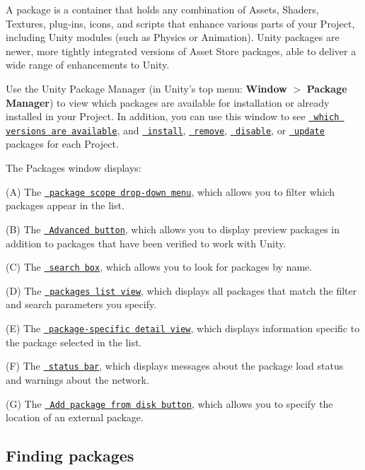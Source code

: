 A package is a container that holds any combination of Assets, Shaders, Textures, plug-\/ins, icons, and scripts that enhance various parts of your Project, including Unity modules (such as Physics or Animation). Unity packages are newer, more tightly integrated versions of Asset Store packages, able to deliver a wide range of enhancements to Unity.

Use the Unity Package Manager (in Unity’s top menu\+: {\bfseries{Window}} $>$ {\bfseries{Package Manager}}) to view which packages are available for installation or already installed in your Project. In addition, you can use this window to see \href{\#VersionList}{\texttt{ which versions are available}}, and \href{\#PackManInstall}{\texttt{ install}}, \href{\#PackManRemove}{\texttt{ remove}}, \href{\#PackManDisable}{\texttt{ disable}}, or \href{\#PackManUpdate}{\texttt{ update}} packages for each Project.



The Packages window displays\+:


\begin{DoxyItemize}
\item (A) The \href{\#scope}{\texttt{ package scope drop-\/down menu}}, which allows you to filter which packages appear in the list.
\item (B) The \href{\#advanced}{\texttt{ Advanced button}}, which allows you to display preview packages in addition to packages that have been verified to work with Unity.
\item (C) The \href{\#searchText}{\texttt{ search box}}, which allows you to look for packages by name.
\item (D) The \href{\#PackManLists}{\texttt{ packages list view}}, which displays all packages that match the filter and search parameters you specify.
\item (E) The \href{\#PackManDetails}{\texttt{ package-\/specific detail view}}, which displays information specific to the package selected in the list.
\item (F) The \href{\#statusbar}{\texttt{ status bar}}, which displays messages about the package load status and warnings about the network.
\item (G) The \href{\#extpkg}{\texttt{ Add package from disk button}}, which allows you to specify the location of an external package.
\end{DoxyItemize}

\label{_PackManLists}%
 \subsection*{Finding packages}

